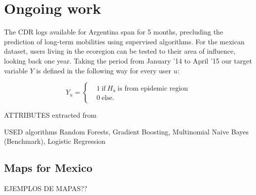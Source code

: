 \section{Ongoing work}

The CDR logs available for Argentina span for 5 months, precluding the prediction of long-term mobilities using supervised algorithms. For the mexican dataset, users living in the ecoregion can be tested to their area of influence, looking back one year. Taking the period from January '14 to April '15 our target variable $Y $ is defined in the following way for every user $u$: 

\[
    Y_u =
      \begin{cases}
        &1 \ \mbox{if} \ H_u \ \mbox{is from epidemic region}\\
        &0 \ \mbox{else}.
      \end{cases}
    \]

ATTRIBUTES extracted from 

USED algorithms {Random Forests, Gradient Boosting, Multinomial Naive Bayes (Benchmark), Logistic Regression}


\subsection{Maps for Mexico}

EJEMPLOS DE MAPAS??